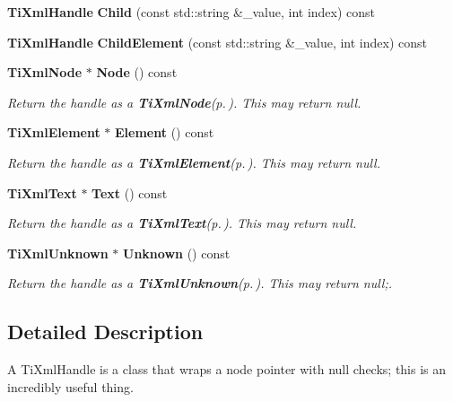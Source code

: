 \begin{CompactItemize}
\item 
{\bf Ti\-Xml\-Handle} {\bf Child} (const std::string \&\_\-value, int index) const\label{classTiXmlHandle_TiXmlHandlea13}

\item 
{\bf Ti\-Xml\-Handle} {\bf Child\-Element} (const std::string \&\_\-value, int index) const\label{classTiXmlHandle_TiXmlHandlea14}

\item 
{\bf Ti\-Xml\-Node} $\ast$ {\bf Node} () const\label{classTiXmlHandle_TiXmlHandlea15}

\begin{CompactList}\small\item\em Return the handle as a {\bf Ti\-Xml\-Node}{\rm (p.\,\pageref{classTiXmlNode})}. This may return null. \item\end{CompactList}\item 
{\bf Ti\-Xml\-Element} $\ast$ {\bf Element} () const\label{classTiXmlHandle_TiXmlHandlea16}

\begin{CompactList}\small\item\em Return the handle as a {\bf Ti\-Xml\-Element}{\rm (p.\,\pageref{classTiXmlElement})}. This may return null. \item\end{CompactList}\item 
{\bf Ti\-Xml\-Text} $\ast$ {\bf Text} () const\label{classTiXmlHandle_TiXmlHandlea17}

\begin{CompactList}\small\item\em Return the handle as a {\bf Ti\-Xml\-Text}{\rm (p.\,\pageref{classTiXmlText})}. This may return null. \item\end{CompactList}\item 
{\bf Ti\-Xml\-Unknown} $\ast$ {\bf Unknown} () const\label{classTiXmlHandle_TiXmlHandlea18}

\begin{CompactList}\small\item\em Return the handle as a {\bf Ti\-Xml\-Unknown}{\rm (p.\,\pageref{classTiXmlUnknown})}. This may return null;. \item\end{CompactList}\end{CompactItemize}


\subsection{Detailed Description}
A Ti\-Xml\-Handle is a class that wraps a node pointer with null checks; this is an incredibly useful thing. 

